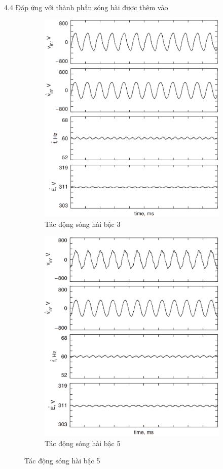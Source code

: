 \documentclass[11pt]{beamer}
\renewcommand{\label}[1]{%
			\gdef\sfname{sf:##1}}%
\begin{document}
\begin{frame}[t]{4.4 Đáp ứng với thành phần sóng hài được thêm vào}
	\begin{figure}
		\begin{subfigure}{0.5\textwidth}
			\includegraphics[width=0.9\linewidth]{fig15a}
			\caption{Tác động sóng hài bậc 3} %
		\end{subfigure}%
		\hspace*{\fill}   %
		\begin{subfigure}{0.5\textwidth}
			\includegraphics[width=0.9\linewidth]{fig15b}
			\caption{Tác động sóng hài bậc 5} %
		\end{subfigure}%
		

\end{figure}
\end{frame}
\end{document}
